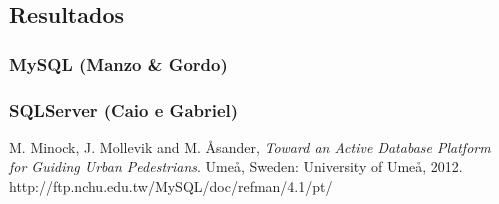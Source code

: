 \documentclass[conference]{IEEEtran}
\begin{document}
  \subsection{Resultados}
    \subsubsection{MySQL (Manzo \& Gordo)}
    \subsubsection{SQLServer (Caio e Gabriel)}

\begin{thebibliography}{1}

M. Minock, J. Mollevik and M. \r{A}sander, \textit{Toward an Active Database Platform for Guiding Urban Pedestrians}. Ume\r{a}, Sweden: University of Ume\r{a}, 2012.
http://ftp.nchu.edu.tw/MySQL/doc/refman/4.1/pt/
\end{thebibliography}
\end{document}
